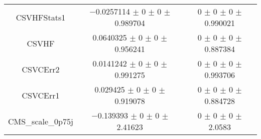\begin{table}
\begin{tabular}{ccc}
CSVHFStats1 	& \num{-0.0257114} $\pm$ \num{0} $\pm$ \num{0} $\pm$ \num{0.989704} 	& \num{0} $\pm$ \num{0} $\pm$ \num{0} $\pm$ \num{0.990021}\\
CSVHF 	& \num{0.0640325} $\pm$ \num{0} $\pm$ \num{0} $\pm$ \num{0.956241} 	& \num{0} $\pm$ \num{0} $\pm$ \num{0} $\pm$ \num{0.887384}\\
CSVCErr2 	& \num{0.0141242} $\pm$ \num{0} $\pm$ \num{0} $\pm$ \num{0.991275} 	& \num{0} $\pm$ \num{0} $\pm$ \num{0} $\pm$ \num{0.993706}\\
CSVCErr1 	& \num{0.029425} $\pm$ \num{0} $\pm$ \num{0} $\pm$ \num{0.919078} 	& \num{0} $\pm$ \num{0} $\pm$ \num{0} $\pm$ \num{0.884728}\\
CMS\_scale\_0p75j 	& \num{-0.139393} $\pm$ \num{0} $\pm$ \num{0} $\pm$ \num{2.41623} 	& \num{0} $\pm$ \num{0} $\pm$ \num{0} $\pm$ \num{2.0583}\\
\bottomrule
\end{tabular}
\end{table}